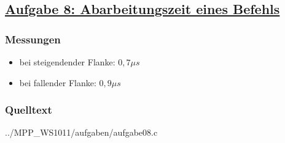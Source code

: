 \subsection*
{\href{http://cst.mi.fu-berlin.de/intern/19606-P-MPP/Aufgaben/040204.html}
{Aufgabe 8: Abarbeitungszeit eines Befehls}}

\subsubsection*{Messungen}
\begin{itemize}
    \item bei steigendender Flanke: $0,7 \mu s$
    \item bei fallender Flanke: $0,9 \mu s$
\end{itemize}

\subsubsection*{Quelltext}


{../MPP_WS1011/aufgaben/aufgabe08.c}
